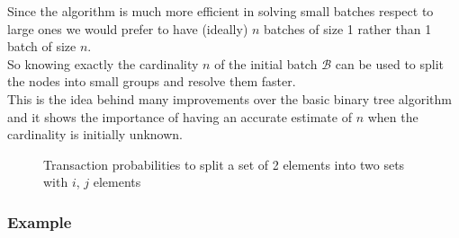 \documentclass[12pt,a4paper,twocolumns]{report}
\begin{document}
Since the algorithm is much more efficient in solving small batches respect to large ones we would prefer to have (ideally)  $n$ batches of size 1 rather than 1 batch of size $n$.\\
So knowing exactly the cardinality $n$ of the initial batch $\mathcal{B}$ can be used to split the nodes into small groups and resolve them faster. \\This is the idea behind many improvements over the basic binary tree algorithm and it shows the importance of having an accurate estimate of $n$ when the cardinality is initially unknown.

\begin{figure}
\centering
{}
\caption[Set split probabilities]{Transaction probabilities to split a set of 2 elements into two sets with $i$, $j$ elements}
\end{figure}

\subsubsection{Example}
\end{document}
